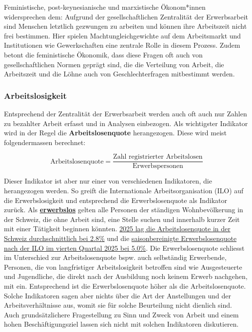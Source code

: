 \documentclass[
  nswissgerman,
  a4paper,
  DIV=11,
  numbers=noendperiod,
  oneside,
  openany]{scrreprt}
\begin{document}
Feministische, post-keynesianische und marxistische Ökonom*innen
widersprechen dem: Aufgrund der gesellschaftlichen Zentralität der
Erwerbsarbeit sind Menschen letztlich gezwungen zu arbeiten und können
ihre Arbeitszeit nicht frei bestimmen. Hier spielen
Machtungleichgewichte auf dem Arbeitsmarkt und Institutionen wie
Gewerkschaften eine zentrale Rolle in diesem Prozess. Zudem betont die
feministische Ökonomik, dass diese Fragen oft auch von
gesellschaftlichen Normen geprägt sind, die die Verteilung von Arbeit,
die Arbeitszeit und die Löhne auch von Geschlechterfragen mitbestimmt
werden.

\subsubsection{Arbeitslosigkeit}\label{arbeitslosigkeit}

Entsprechend der Zentralität der Erwerbsarbeit werden auch oft auch nur
Zahlen zu bezahlter Arbeit erfasst und in Analysen einbezogen. Als
wichtigster Indikator wird in der Regel die \textbf{Arbeitslosenquote}
herangezogen. Diese wird meist folgendermassen berechnet:

\[\text{Arbeitslosenquote} = \frac{\text{Zahl registrierter Arbeitslosen}}{\text{Erwerbspersonen}}\]

Dieser Indikator ist aber nur einer von verschiedenen Indikatoren, die
herangezogen werden. So greift die Internationale Arbeitsorganisation
(ILO) auf die Erwerbslosigkeit und entsprechend die Erwerbslosenquote
als Indikator zurück. Als
\href{http://www.bfs.admin.ch/bfs/de/home/statistiken/arbeit-erwerb/erhebungen/els-ilo.html}{\textbf{erwerbslos}}
gelten alle Personen der ständigen Wohnbevölkerung in der Schweiz, die
ohne Arbeit sind, eine Stelle suchen und innerhalb kurzer Zeit mit einer
Tätigkeit beginnen könnten.
\href{https://www.admin.ch/de/newnsb/yFqP7XwYSs3ODBR8ZdR9g}{2025 lag die
Arbeitslosenquote in der Schweiz durchschnittlich bei 2.8\%} und die
\href{https://www.bfs.admin.ch/bfs/rm/home/statisticas/catalogs-bancas-datas.assetdetail.36326600.html}{saisonbereinigte
Erwerbslosenquote nach der ILO im vierten Quartal 2025 bei 5.0\%}. Die
Erwerbslosenquote schliesst im Unterschied zur Arbeitslosenquote bspw.
auch selbständig Erwerbende, Personen, die von langfristiger
Arbeitslosigkeit betroffen sind wie Ausgesteuerte und Jugendliche, die
direkt nach der Ausbildung noch keinem Erwerb nachgehen, mit ein.
Entsprechend ist die Erwerbslosenquote höher als die Arbeitslosenquote.
Solche Indikatoren sagen aber nichts über die Art der Anstellungen und
der Arbeitsverhältnisse aus, womit sie für solche Beurteilung nicht
dienlich sind. Auch grundsätzlichere Fragestellung zu Sinn und Zweck von
Arbeit und einem hohen Beschäftigungsziel lassen sich nicht mit solchen
Indikatoren diskutieren.
\end{document}
